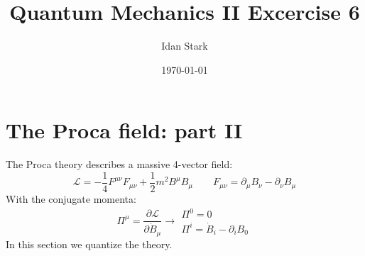 \documentclass{article}
\title{Quantum Mechanics II Excercise 6}
\author{Idan Stark}
\date{\today}
\begin{document}
\maketitle

\section{The Proca field: part II}
The Proca theory describes a massive 4-vector field:
\begin{equation}
    \mathcal{L} = -\frac{1}{4}F^{\mu\nu}F_{\mu\nu} + \frac{1}{2}m^2B^{\mu}B_{\mu}
    \qquad
    F_{\mu\nu} = \partial_\mu B_\nu - \partial_\nu B_\mu
\end{equation}
With the conjugate momenta:
\begin{equation}
    \Pi^\mu = \frac{\partial \mathcal{L}}{\partial \dot{B}_\mu} \rightarrow \begin{matrix}
        \Pi^0 = 0 \\ \Pi^i = \dot{B}_i - \partial_i B_0
    \end{matrix}
\end{equation}
In this section we quantize the theory.
\end{document}
